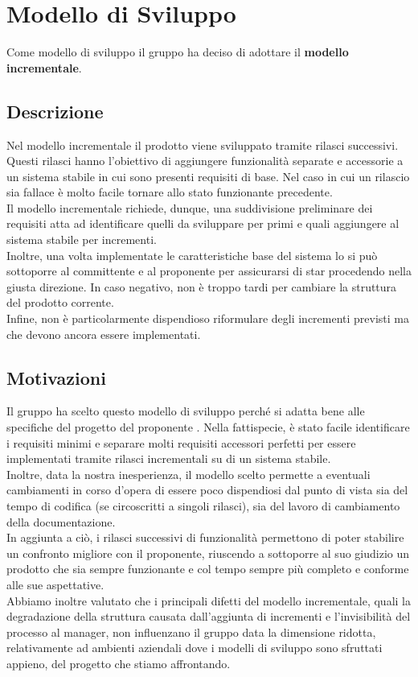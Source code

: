 \section{Modello di Sviluppo}
Come modello di sviluppo il gruppo \Gruppo{} ha deciso di adottare il \textbf{modello incrementale}.
\subsection{Descrizione}
Nel modello incrementale il prodotto viene sviluppato tramite rilasci successivi. Questi rilasci hanno l'obiettivo di aggiungere funzionalità separate e accessorie a un sistema stabile in cui sono presenti requisiti di base.
Nel caso in cui un rilascio sia fallace è molto facile tornare allo stato funzionante precedente.\\
Il modello incrementale richiede, dunque, una suddivisione preliminare dei requisiti atta ad identificare quelli da sviluppare per primi e quali aggiungere al sistema stabile per incrementi. \\
Inoltre, una volta implementate le caratteristiche base del sistema lo si può sottoporre al committente e al proponente per assicurarsi di star procedendo nella giusta direzione.
In caso negativo, non è troppo tardi per cambiare la struttura del prodotto corrente. \\
Infine, non è particolarmente dispendioso riformulare degli incrementi previsti ma che devono ancora essere implementati. 

\subsection{Motivazioni}
Il gruppo ha scelto questo modello di sviluppo perché si adatta bene alle specifiche del progetto \NomeProgetto{} del proponente \Proponente{}.
Nella fattispecie, è stato facile identificare i requisiti minimi e separare molti requisiti accessori perfetti per essere implementati tramite rilasci incrementali su di un sistema stabile.\\
Inoltre, data la nostra inesperienza, il modello scelto permette a eventuali cambiamenti in corso d'opera di essere poco dispendiosi dal punto di vista sia del tempo di codifica (se circoscritti a singoli rilasci), sia del lavoro di cambiamento della documentazione. \\
In aggiunta a ciò, i rilasci successivi di funzionalità permettono di poter stabilire un confronto migliore con il proponente, riuscendo a sottoporre al suo giudizio un prodotto che sia sempre funzionante e col tempo sempre più completo e conforme alle sue aspettative. \\
Abbiamo inoltre valutato che i principali difetti del modello incrementale, quali la degradazione della struttura causata dall'aggiunta di incrementi e l'invisibilità del processo al manager, 
non influenzano il gruppo data la dimensione ridotta, relativamente ad ambienti aziendali dove i modelli di sviluppo sono sfruttati appieno, del progetto che stiamo affrontando.


